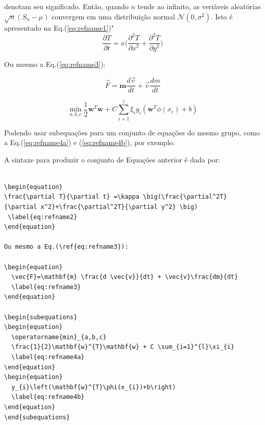 \documentclass[12pt,A4,A4pt]{article}
\begin{document}
denotam seu significado. Então, quando $n$ tende ao infinito, as veriáveis aleatórias $\sqrt{n}(S_n - \mu)$ convergem em uma distribuição normal $\mathcal{N}(0, \sigma^2)$. Isto é apresentado na Eq.(\ref{eq:refname1})"\\



\begin{equation}
 \frac{\partial T}{\partial t} =\kappa \big(\frac{\partial^2T}{\partial x^2}+\frac{\partial^2T}{\partial y^2} \big) 
 \label{eq:refname2}
\end{equation}

Ou mesmo a Eq.(\ref{eq:refname3}):

\begin{equation}
  \vec{F}=\mathbf{m} \frac{d \vec{v}}{dt} + \vec{v}\frac{dm}{dt} 
  \label{eq:refname3}
\end{equation}

\begin{subequations}
\begin{equation}
  \operatorname{min}_{a,b,c} 
  \frac{1}{2}\mathbf{w}^{T}\mathbf{w} + C \sum_{i=1}^{l}\xi_{i}
  \label{eq:refname4a}
\end{equation}    
\begin{equation}
  y_{i}\left(\mathbf{w}^{T}\phi(x_{i})+b\right)
  \label{eq:refname4b}
\end{equation}
\end{subequations}

Podendo usar subequações para um conjunto de equações do mesmo grupo, como a Eq.(\ref{eq:refname4a}) e (\ref{eq:refname4b}), por exemplo.

A sintaxe para produzir o conjunto de Equações anterior é dada por:

\begin{verbatim}

\begin{equation}
\frac{\partial T}{\partial t} =\kappa \big(\frac{\partial^2T}
{\partial x^2}+\frac{\partial^2T}{\partial y^2} \big) 
 \label{eq:refname2}
\end{equation}

Ou mesmo a Eq.(\ref{eq:refname3}):

\begin{equation}
  \vec{F}=\mathbf{m} \frac{d \vec{v}}{dt} + \vec{v}\frac{dm}{dt} 
  \label{eq:refname3}
\end{equation}

\begin{subequations}
\begin{equation}
  \operatorname{min}_{a,b,c} 
  \frac{1}{2}\mathbf{w}^{T}\mathbf{w} + C \sum_{i=1}^{l}\xi_{i}
  \label{eq:refname4a}
\end{equation}    
\begin{equation}
  y_{i}\left(\mathbf{w}^{T}\phi(x_{i})+b\right)
  \label{eq:refname4b}
\end{equation}
\end{subequations}

\end{verbatim}
\end{document}
